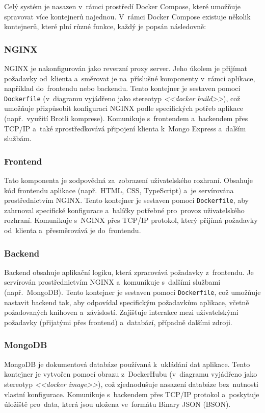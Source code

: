 \documentclass[male,czech,api_bc]{kitheses}
\begin{document}
Celý systém je nasazen v~rámci prostředí Docker Compose, které umožňuje spravovat více kontejnerů najednou. V~rámci Docker Compose existuje několik kontejnerů, které plní různé funkce, každý je popsán následovně:

\subsubsection{NGINX}
NGINX je nakonfigurován jako reverzní proxy server. Jeho úkolem je přijímat požadavky od~klienta a~směrovat je na~příslušné komponenty v~rámci aplikace, například do~frontendu nebo backendu. Tento kontejner je sestaven pomocí \texttt{Dockerfile} (v~diagramu vyjádřeno jako stereotyp \textit{<<docker build>>}), což umožňuje přizpůsobit konfiguraci NGINX podle specifických potřeb aplikace (např.~využití Brotli komprese). Komunikuje s~frontendem a~backendem přes TCP/IP a~také zprostředkovává připojení klienta k~Mongo Express a~dalším službám.

\subsubsection{Frontend}
Tato komponenta je zodpovědná za~zobrazení uživatelského rozhraní. Obsahuje kód frontendu aplikace (např.~HTML, CSS, TypeScript) a~je servírována prostřednictvím NGINX. Tento kontejner je sestaven pomocí \texttt{Dockerfile}, aby zahrnoval specifické konfigurace a~balíčky potřebné pro~provoz uživatelského rozhraní. Komunikuje s~NGINX přes TCP/IP protokol, který přijímá požadavky od~klienta a~přesměrovává je do~frontendu.

\subsubsection{Backend}
Backend obsahuje aplikační logiku, která zpracovává požadavky z~frontendu. Je servírován prostřednictvím NGINX a~komunikuje s~dalšími službami (např.~MongoDB). Tento kontejner je sestaven pomocí \texttt{Dockerfile}, což umožňuje nastavit backend tak, aby odpovídal specifickým požadavkům aplikace, včetně požadovaných knihoven a~závislostí. Zajišťuje interakce mezi uživatelskými požadavky (přijatými přes frontend) a~databází, případně dalšími zdroji.

\subsubsection{MongoDB}
MongoDB je dokumentová databáze používaná k~ukládání dat aplikace. Tento kontejner je vytvořen pomocí obrazu z~DockerHubu (v~diagramu vyjádřeno jako stereotyp \textit{<<docker image>>}), což zjednodušuje nasazení databáze bez~nutnosti vlastní konfigurace. Komunikuje s~backendem přes TCP/IP protokol a~poskytuje úložiště pro~data, která jsou uložena ve~formátu Binary JSON (BSON).
\end{document}
